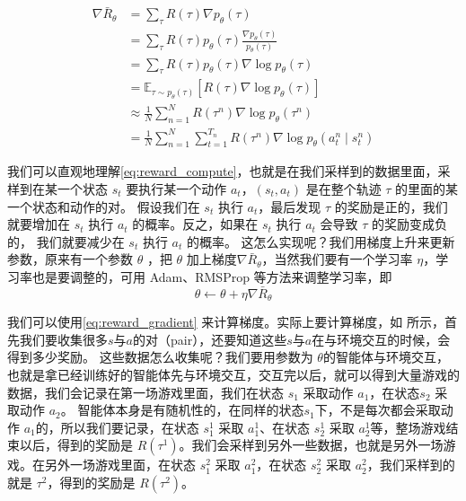 \begin{equation}
    \label{eq:reward_compute}
    \begin{aligned}
        \nabla \bar{R}_{\theta}&=\sum_{\tau} R(\tau) \nabla p_{\theta}(\tau)\\&=\sum_{\tau} R(\tau) p_{\theta}(\tau) \frac{\nabla p_{\theta}(\tau)}{p_{\theta}(\tau)} \\&=
        \sum_{\tau} R(\tau) p_{\theta}(\tau) \nabla \log p_{\theta}(\tau) \\
        &=\mathbb{E}_{\tau \sim p_{\theta}(\tau)}\left[R(\tau) \nabla \log p_{\theta}(\tau)\right]\\
        &\approx \frac{1}{N} \sum_{n=1}^{N} R\left(\tau^{n}\right) \nabla \log p_{\theta}\left(\tau^{n}\right) \\
        &=\frac{1}{N} \sum_{n=1}^{N} \sum_{t=1}^{T_{n}} R\left(\tau^{n}\right) \nabla \log p_{\theta}\left(a_{t}^{n} \mid s_{t}^{n}\right)
        \end{aligned}
\end{equation}

我们可以直观地理解\eqref{eq:reward_compute}，也就是在我们采样到的数据里面，采样到在某一个状态 $s_t$ 要执行某一个动作 $a_t$，$(s_t,a_t)$ 是在整个轨迹 $\tau$ 的里面的某一个状态和动作的对。
假设我们在 $s_t$ 执行 $a_t$，最后发现 $\tau$ 的奖励是正的，我们就要增加在 $s_t$ 执行 $a_t$ 的概率。反之，如果在 $s_t$ 执行 $a_t$ 会导致 $\tau$ 的奖励变成负的， 我们就要减少在 $s_t$ 执行 $a_t$ 的概率。
这怎么实现呢？我们用梯度上升来更新参数，原来有一个参数 $\theta$ ，把 $\theta$  加上梯度$\nabla \bar{R}_{\theta}$，当然我们要有一个学习率 $\eta$，学习率也是要调整的，可用 Adam、RMSProp 等方法来调整学习率，即
\begin{equation}
    \label{eq:}
    \theta \leftarrow \theta+\eta \nabla \bar{R}_{\theta}
\end{equation}

我们可以使用\eqref{eq:reward_gradient} 来计算梯度。实际上要计算梯度，如 所示，首先我们要收集很多$s$与$a$的对（pair），还要知道这些$s$与$a$在与环境交互的时候，会得到多少奖励。 这些数据怎么收集呢？我们要用参数为 $\theta$的智能体与环境交互， 也就是拿已经训练好的智能体先与环境交互，交互完以后，就可以得到大量游戏的数据，我们会记录在第一场游戏里面，我们在状态 $s_1$ 采取动作 $a_1$，在状态$s_2$ 采取动作 $a_2$。
智能体本身是有随机性的，在同样的状态$s_1$下，不是每次都会采取动作 $a_1$的，所以我们要记录，在状态 $s_1^1$ 采取 $a_1^1$、在状态 $s_2^1$ 采取 $a_2^1$等，整场游戏结束以后，得到的奖励是 $R(\tau^1)$。我们会采样到另外一些数据，也就是另外一场游戏。在另外一场游戏里面，在状态 $s_1^2$ 采取 $a_1^2$，在状态 $s_2^2$ 采取 $a_2^2$，我们采样到的就是 $\tau^2$，得到的奖励是 $R(\tau^2)$。

